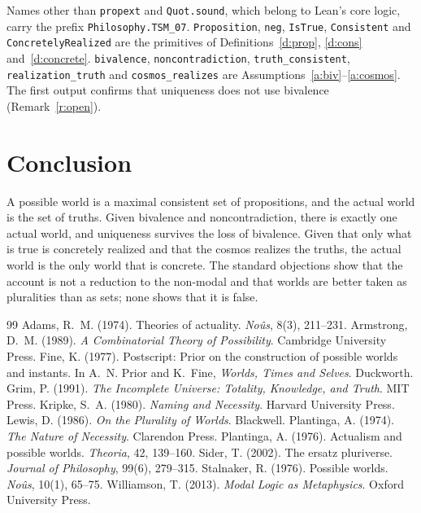 \documentclass{situationist-preprint}
\begin{document}
\begin{sloppypar}Names other than \texttt{propext} and \texttt{Quot.sound}, which belong to Lean's core logic, carry the prefix \texttt{Philosophy.TSM\_07}. \texttt{Proposition}, \texttt{neg}, \texttt{IsTrue}, \texttt{Consistent} and \texttt{ConcretelyRealized} are the primitives of Definitions~\ref{d:prop}, \ref{d:cons} and~\ref{d:concrete}. \texttt{bivalence}, \texttt{noncontradiction}, \texttt{truth\_consistent}, \texttt{realization\_truth} and \texttt{cosmos\_realizes} are Assumptions~\ref{a:biv}--\ref{a:cosmos}. The first output confirms that uniqueness does not use bivalence (Remark~\ref{r:open}).\end{sloppypar}

\section{Conclusion}

A possible world is a maximal consistent set of propositions, and the actual world is the set of truths. Given bivalence and noncontradiction, there is exactly one actual world, and uniqueness survives the loss of bivalence. Given that only what is true is concretely realized and that the cosmos realizes the truths, the actual world is the only world that is concrete. The standard objections show that the account is not a reduction to the non-modal and that worlds are better taken as pluralities than as sets; none shows that it is false.

\begin{thebibliography}{99}\small
{} Adams, R.~M. (1974). Theories of actuality. \emph{No\^us}, 8(3), 211--231.
 Armstrong, D.~M. (1989). \emph{A Combinatorial Theory of Possibility}. Cambridge University Press.
 Fine, K. (1977). Postscript: Prior on the construction of possible worlds and instants. In A.~N. Prior and K.~Fine, \emph{Worlds, Times and Selves}. Duckworth.
 Grim, P. (1991). \emph{The Incomplete Universe: Totality, Knowledge, and Truth}. MIT Press.
 Kripke, S.~A. (1980). \emph{Naming and Necessity}. Harvard University Press.
 Lewis, D. (1986). \emph{On the Plurality of Worlds}. Blackwell.
 Plantinga, A. (1974). \emph{The Nature of Necessity}. Clarendon Press.
 Plantinga, A. (1976). Actualism and possible worlds. \emph{Theoria}, 42, 139--160.
 Sider, T. (2002). The ersatz pluriverse. \emph{Journal of Philosophy}, 99(6), 279--315.
 Stalnaker, R. (1976). Possible worlds. \emph{No\^us}, 10(1), 65--75.
 Williamson, T. (2013). \emph{Modal Logic as Metaphysics}. Oxford University Press.
\end{thebibliography}
\end{document}
